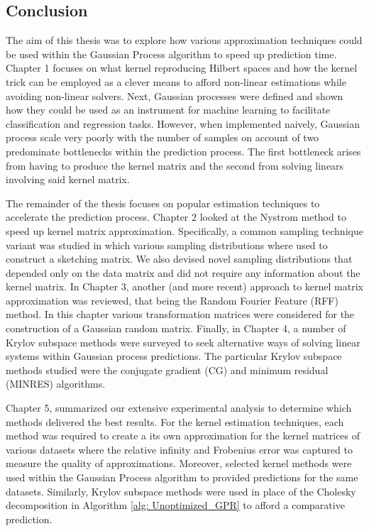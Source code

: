 \subsection{Conclusion}\label{Section5.4}

The aim of this thesis was to explore how various approximation techniques could be used within the Gaussian Process algorithm to speed up prediction time. Chapter 1 focuses on what kernel reproducing Hilbert spaces and how the kernel trick can be employed as a clever means to afford non-linear estimations while avoiding non-linear solvers. Next, Gaussian processes were defined and shown how they could be used as an instrument for machine learning to facilitate classification and regression tasks. However, when implemented naively, Gaussian process scale very poorly with the number of samples on account of two predominate bottlenecks within the prediction process. The first bottleneck arises from having to produce the kernel matrix and the second from solving linears involving said kernel matrix.

The remainder of the thesis focuses on popular estimation techniques to accelerate the prediction process. Chapter 2 looked at the Nystrom method to speed up kernel matrix approximation. Specifically, a common sampling technique variant was studied in which various sampling distributions where used to construct a sketching matrix. We also devised novel sampling distributions that depended only on the data matrix and did not require any information about the kernel matrix. In Chapter 3, another (and more recent) approach to kernel matrix approximation was reviewed, that being the Random Fourier Feature (RFF) method. In this chapter various transformation matrices were considered for the construction of a Gaussian random matrix. Finally, in Chapter 4, a number of Krylov subspace methods were surveyed to seek alternative ways of solving linear systems within Gaussian process predictions. The particular Krylov subspace methods studied were the conjugate gradient (CG) and minimum residual (MINRES) algorithms.

Chapter 5, summarized our extensive experimental analysis to determine which methods delivered the best results. For the kernel estimation techniques, each method was required to create a its own approximation for the kernel matrices of various datasets where the relative infinity and Frobenius error was captured to measure the quality of approximations. Moreover, selected kernel methods were used within the Gaussian Process algorithm to provided predictions for the same datasets. Similarly, Krylov subspace methods were used in place of the Cholesky decomposition in Algorithm \ref{alg: Unoptimized_GPR} to afford a comparative prediction.

